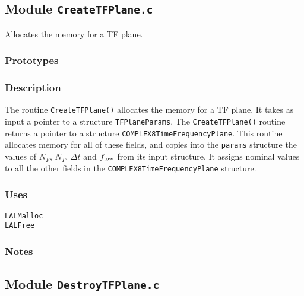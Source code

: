\newpage
\subsection{Module \texttt{CreateTFPlane.c}}
\label{ss:CreateTFPlane.c}

Allocates the memory for a TF plane.

\subsubsection*{Prototypes}
\vspace{0.1in}


\subsubsection*{Description}

The routine \verb+CreateTFPlane()+ allocates the memory for a TF plane.  It
takes as input a pointer to a structure \verb+TFPlaneParams+.  The
\verb+CreateTFPlane()+ routine returns a pointer to a structure
\verb+COMPLEX8TimeFrequencyPlane+.    This routine allocates memory for all of
these fields, and copies into the \verb+params+ structure the values of $N_F$,
$N_T$, ${\overline {\Delta t}}$ and $f_{\rm low}$ from its input structure.
It assigns nominal values to all the other fields in the
\verb+COMPLEX8TimeFrequencyPlane+ structure. 

\subsubsection*{Uses}
\begin{verbatim}
LALMalloc
LALFree
\end{verbatim}

\subsubsection*{Notes}

\vfill{\footnotesize}

\newpage
\subsection{Module \texttt{DestroyTFPlane.c}}
\label{ss:DestroyTFPlane.c}


